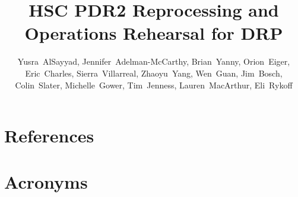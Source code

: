 \documentclass[OPS,authoryear,toc]{lsstdoc}
\title{HSC PDR2 Reprocessing and Operations Rehearsal for DRP}
\author{%
Yusra~AlSayyad, 
Jennifer~Adelman-McCarthy, 
Brian~Yanny, 
Orion~Eiger, 
Eric~Charles, 
Sierra~Villarreal, 
Zhaoyu~Yang, 
Wen~Guan, 
Jim~Bosch, 
Colin~Slater, 
Michelle~Gower, 
Tim~Jenness, 
Lauren~MacArthur, 
Eli~Rykoff
}
\date{\vcsDate}
\begin{document}
\maketitle



\appendix
\section{References} \label{sec:bib}
\renewcommand{\refname}{} %


\section{Acronyms} \label{sec:acronyms}

\end{document}
